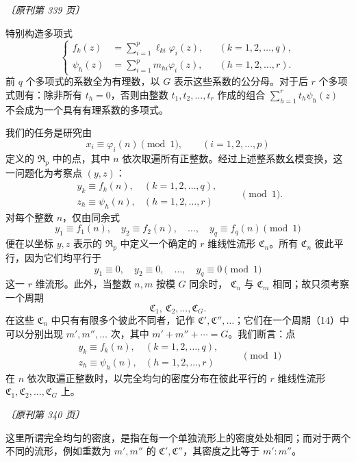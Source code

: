 \documentclass[UTF8,11pt,a4paper,fontset=none]{ctexart}
\theoremstyle{weylthm}
\newcommand{\origpage}[1]{%
  \par\vspace{0.7em}\noindent\hfill{\small\itshape〔原刊第 #1 页〕}\par\vspace{0.25em}}
\begin{document}
\origpage{339}

特别构造多项式
\[
\left\{
\begin{aligned}
 f_k(z)&=\sum_{i=1}^{p}\ell_{ki}\varphi_i(z),
 &&(k=1,2,\ldots,q),\\
 \psi_h(z)&=\sum_{i=1}^{p}m_{hi}\varphi_i(z),
 &&(h=1,2,\ldots,r).
\end{aligned}
\right.
\]
前 \(q\) 个多项式的系数全为有理数，以 \(G\) 表示这些系数的公分母。对于后
\(r\) 个多项式则有：除非所有 \(t_h=0\)，否则由整数
\(t_1,t_2,\ldots,t_r\) 作成的组合
\(\sum_{h=1}^{r}t_h\psi_h(z)\) 不会成为一个具有有理系数的多项式。

我们的任务是研究由
\[
  x_i\equiv\varphi_i(n)\pmod 1,
  \qquad(i=1,2,\ldots,p)
\]
定义的 \(\mathfrak R_p\) 中的点，其中 \(n\) 依次取遍所有正整数。经过上述整系数幺模变换，这一问题化为考察点 \((y,z)\)：
\[
\begin{array}{ll}
 y_k\equiv f_k(n), &(k=1,2,\ldots,q),\\
 z_h\equiv\psi_h(n), &(h=1,2,\ldots,r)
\end{array}
\qquad\pmod 1.
\]
对每个整数 \(n\)，仅由同余式
\[
  y_1\equiv f_1(n),\quad y_2\equiv f_2(n),\quad\ldots,\quad
  y_q\equiv f_q(n)\pmod 1
\]
便在以坐标 \(y,z\) 表示的 \(\mathfrak R_p\) 中定义一个确定的
\(r\) 维线性流形 \(\mathfrak C_n\)。所有 \(\mathfrak C_n\) 彼此平行，因为它们均平行于
\[
  y_1\equiv0,\quad y_2\equiv0,\quad\ldots,\quad y_q\equiv0\pmod 1
\]
这一 \(r\) 维流形。此外，当整数 \(n,m\) 按模 \(G\) 同余时，
\(\mathfrak C_n\) 与 \(\mathfrak C_m\) 相同；故只须考察一个周期
\begin{equation}
  \mathfrak C_1,\ \mathfrak C_2,\ldots,\mathfrak C_G.
  \tag{14}
\end{equation}
在这些 \(\mathfrak C_n\) 中只有有限多个彼此不同者，记作
\(\mathfrak C',\mathfrak C'',\ldots\)；它们在一个周期（14）中可以分别出现
\(m',m'',\ldots\) 次，其中
\(m'+m''+\cdots=G\)。我们断言：点
\begin{equation}
\begin{array}{ll}
 y_k\equiv f_k(n), &(k=1,2,\ldots,q),\\
 z_h\equiv\psi_h(n), &(h=1,2,\ldots,r)
\end{array}
\qquad\pmod 1
\tag{15}
\end{equation}
在 \(n\) 依次取遍正整数时，以完全均匀的密度分布在彼此平行的
\(r\) 维线性流形
\(\mathfrak C_1,\mathfrak C_2,\ldots,\mathfrak C_G\) 上。

\origpage{340}

这里所谓完全均匀的密度，是指在每一个单独流形上的密度处处相同；而对于两个不同的流形，例如重数为
\(m',m''\) 的 \(\mathfrak C',\mathfrak C''\)，其密度之比等于
\(m':m''\)。
\end{document}
